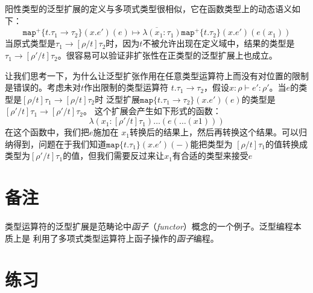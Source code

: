 阳性类型的泛型扩展的定义与多项式类型很相似，它在函数类型上的动态语义如下：
\begin{equation}\label{eq:positive-type-dynamics}
\overline{\texttt{map}^+\{t.\tau_1\rightarrow\tau_2\}(x.e')(e)\mapsto
\lambda(x_1:\tau_1)\texttt{map}^+\{t.\tau_2\}(x.e')(e(x_1))}
\end{equation}
当原式类型是$\tau_1\rightarrow[\rho/t]\tau_2$时，因为$t$不被允许出现在定义域中，结果的类型是
$\tau_1\rightarrow[\rho'/t]\tau_2$。很容易可以验证非扩张性在正类型的泛型扩展上也成立。

让我们思考一下，为什么让泛型扩张作用在任意类型运算符上而没有对位置的限制是错误的。考虑未对$t$作出限制的类型运算符
$t.\tau_1\rightarrow\tau_2$，假设$x:\rho\vdash e':\rho'$。当$e$的类型是$[\rho/t]\tau_1\rightarrow[\rho/t]\tau_2$时
泛型扩展$\texttt{map} \{t.\tau_1\rightarrow\tau_2 \} (x.e')(e)$的类型是$[\rho'/t]\tau_1\rightarrow[\rho'/t]\tau_2$。
这个扩展会产生如下形式的函数：$$\lambda(x_1:[\rho'/t]\tau_1)\dots(e(\dots(x1)))$$在这个函数中，我们把$e$施加在
$x_1$转换后的结果上，然后再转换这个结果。可以归纳得到，问题在于我们知道$\texttt{map}\{t.\tau_1\}(x.e')(-)$能把类型为
$[\rho/t]\tau_1$的值转换成类型为$[\rho'/t]\tau_1$的值，但我们需要反过来让$x_1$有合适的类型来接受$e$

\section{备注}

\noindent 类型运算符的泛型扩展是范畴论中\textit{函子}（\textit{functor}）概念的一个例子。泛型编程本质上是
利用了多项式类型运算符上函子操作的\textit{函子}编程。

\section*{练习}

